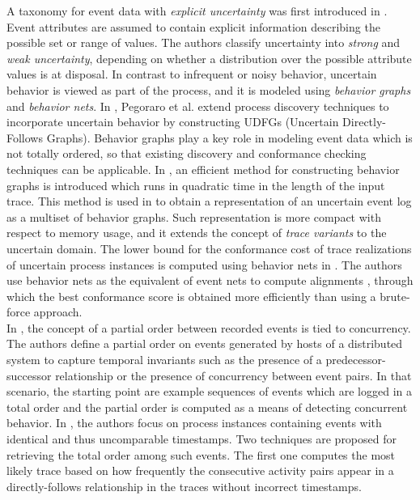 \label{sec: rel work}

A taxonomy for event data with \textit{explicit uncertainty} was first introduced in \cite{mining}.
Event attributes are assumed to contain explicit information describing the possible set or range of values.
The authors classify uncertainty into \textit{strong} and \textit{weak uncertainty}, depending on whether a distribution over the possible attribute values is at disposal.
In contrast to infrequent or noisy behavior, uncertain behavior is viewed as part of the process, and it is modeled using \textit{behavior graphs} and \textit{behavior nets}.
In \cite{discovery}, Pegoraro et al. extend process discovery techniques to incorporate uncertain behavior by constructing UDFGs (Uncertain Directly-Follows Graphs).
Behavior graphs play a key role in modeling event data which is not totally ordered, so that existing discovery and conformance checking techniques can be applicable.
In \cite{efficient}, an efficient method for constructing behavior graphs is introduced which runs in quadratic time in the length of the input trace.
This method is used in \cite{space} to obtain a representation of an uncertain event log as a multiset of behavior graphs.
Such representation is more compact with respect to memory usage, and it extends the concept of \textit{trace variants} to the uncertain domain.
The lower bound for the conformance cost of trace realizations of uncertain process instances is computed using behavior nets in \cite{conformance}. 
The authors use behavior nets as the equivalent of event nets to compute alignments \cite{alignment}, through which the best conformance score is obtained more efficiently than using a brute-force approach.\\
In \cite{distributed}, the concept of a partial order between recorded events is tied to concurrency.
The authors define a partial order on events generated by hosts of a distributed system to capture temporal invariants such as the presence of a predecessor-successor relationship or the presence of concurrency between event pairs.
In that scenario, the starting point are example sequences of events which are logged in a total order and the partial order is computed as a means of detecting concurrent behavior.
In \cite{repair}, the authors focus on process instances containing events with identical and thus uncomparable timestamps. 
Two techniques are proposed for retrieving the total order among such events.
The first one computes the most likely trace based on how frequently the consecutive activity pairs appear in a directly-follows relationship in the traces without incorrect timestamps.
